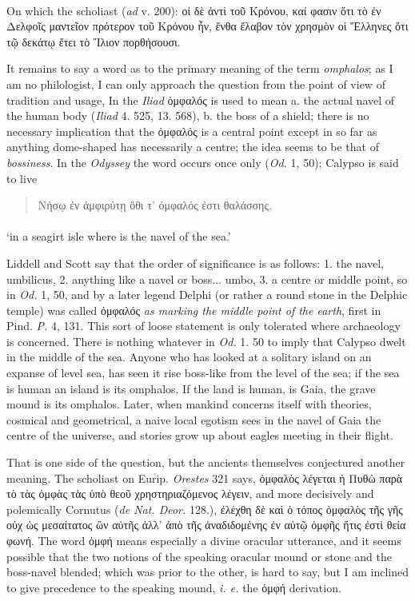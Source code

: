 \documentclass[a4paper, 11pt, oneside, polutonikogreek, english]{article}
\begin{document}
\paragraph{}
On which the scholiast (\emph{ad} v. 200): οἱ δὲ ἀντὶ τοῦ Κρόνου, καί φασιν ὅτι τὸ ἐν Δελφοῖς μαντεῖον πρότερον τοῦ Κρόνου ἦν, ἔνθα ἔλαβον τὸν χρησμὸν οἱ Ἕλληνες ὅτι τῷ δεκάτῳ ἔτει τὸ Ἴλιον πορθήσουσι.

It remains to say a word as to the primary meaning of the term \emph{omphalos}; as I am no philologist, I can only approach the question from the point of view of tradition and usage, In the \emph{Iliad} ὀμφαλός is used to mean a. the actual navel of the human body (\emph{Iliad} 4. 525, 13. 568), b. the boss of a shield; there is no necessary implication that the ὀμφαλός is a central point except in so far as anything dome-shaped has necessarily a centre; the idea seems to be that of \emph{bossiness}. In the \emph{Odyssey} the word occurs once only (\emph{Od.} 1, 50); Calypso is said to live
\begin{quotation}
\large
Νήσῳ ἐν ἀμφιρύτῃ ὅθι τ' ὀμφαλός ἐστι θαλάσσης,
\end{quotation}
\paragraph{}
`in a seagirt isle where is the navel of the sea.'

Liddell and Scott say that the order of significance is as follows: 1. the navel, umbilicus, 2. anything like a navel or boss... umbo, 3. a centre or middle point, so in \emph{Od.} 1, 50, and by a later legend Delphi (or rather a round stone in the Delphic temple) was called ὀμφαλός \emph{as marking the middle point of the earth}, first in Pind. \emph{P.} 4, 131. This sort of loose statement is only tolerated where archaeology is concerned. There is nothing whatever in \emph{Od.} 1. 50 to imply that Calypso dwelt in the middle of the sea. Anyone who has looked at a solitary island on an expanse of level sea, has seen it rise boss-like from the level of the sea; if the sea is human an island is its omphalos. If the land is human, is Gaia, the grave mound is its omphalos. Later, when mankind concerns itself with theories, cosmical and geometrical, a naive local egotism sees in the navel of Gaia the centre of the universe, and stories grow up about eagles meeting in their flight.

That is one side of the question, but the ancients themselves conjectured another meaning. The scholiast on Eurip. \emph{Orestes} 321 says, ὀμφαλὸς λέγεται ἡ Πυθὼ παρὰ τὸ τὰς ὀμφὰς τὰς ὑπὸ θεοῦ χρηστηριαζόμενος λέγειν, and more decisively and polemically Cornutus (\emph{de Nat. Deor.} 128.), ἐλέχθη δὲ καὶ ὁ τόπος ὀμφαλὸς τῆς γῆς οὐχ ὡς μεσαίτατος ὢν αὐτῆς ἀλλ' ἀπὸ τῆς ἀναδιδομένης ἐν αὐτῷ ὀμφῆς ἥτις ἐστὶ θεία φωνή. The word ὀμφή means especially a divine oracular utterance, and it seems possible that the two notions of the speaking oracular mound or stone and the boss-navel blended; which was prior to the other, is hard to say, but I am inclined to give precedence to the speaking mound, \emph{i. e.} the ὀμφή derivation.
\end{document}
